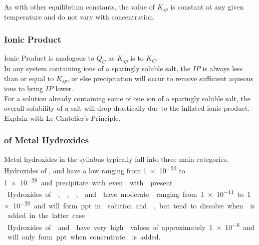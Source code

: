 \documentclass[../main]{subfiles}
\begin{document}
	As with other equilibrium constants, the value of \(K_{sp}\) is constant at any given temperature and do not vary with concentration. \\

	\subsubsection{Ionic Product}


	Ionic Product is analogous to \(Q_C\) as \(K_{sp}\) is to \(K_C\). \\

	In any system containing ions of a sparingly soluble salt, the \(IP\) is always less than or equal to \(K_{sp}\), or else precipitation will occur to remove sufficient aqueous ions to bring \(IP\) lower. \\

	For a solution already containing some of one ion of a sparingly soluble salt, the overall solubility of a salt will drop drastically due to the inflated ionic product. Explain with Le Chatelier's Principle. \\

	\subsubsection{ of Metal Hydroxides}

	Metal hydroxides in the syllabus typically fall into three main categories. \\

	Hydroxides of ,  and  have a low  ranging from \SI{1e-23}{} to \SI{1e-29} and precipitate with even  with  present. \\

	Hydroxides of , , ,  and  have moderate  ranging from \SI{1e-11} to \SI{1e-20} and will form ppt in  solution and , but tend to dissolve when  is added in the latter case. \\

	Hydroxides of  and  have very high  values of approximately \SI{1e-6} and will only form ppt when concentrate  is added.
\end{document}

